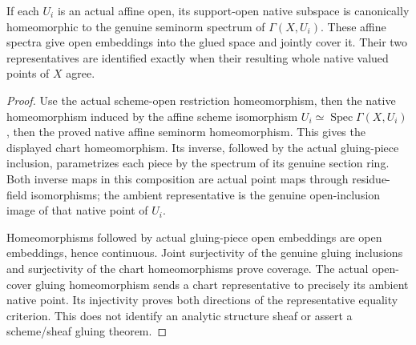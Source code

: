 \begin{theorem}
\label{scheme:native-affine-atlas}
\leanok
{}
If each $U_i$ is an actual affine open, its support-open native subspace
is canonically homeomorphic to the genuine seminorm spectrum of
$\Gamma(X,U_i)$. These affine spectra give open embeddings into the glued
space and jointly cover it. Their two representatives are identified
exactly when their resulting whole native valued points of $X$ agree.
\end{theorem}
\begin{proof}
Use the actual scheme-open restriction homeomorphism, then the native
homeomorphism induced by the affine scheme isomorphism
$U_i\simeq\operatorname{Spec}\Gamma(X,U_i)$, then the proved native affine
seminorm homeomorphism. This gives the displayed chart homeomorphism. Its
inverse, followed by the actual gluing-piece inclusion, parametrizes each
piece by the spectrum of its genuine section ring. Both inverse maps in
this composition are actual point maps through residue-field isomorphisms;
the ambient representative is the genuine open-inclusion image of that
native point of $U_i$.

Homeomorphisms followed by actual gluing-piece open embeddings are open
embeddings, hence continuous. Joint surjectivity of the genuine gluing
inclusions and surjectivity of the chart homeomorphisms prove coverage.
The actual open-cover gluing homeomorphism sends a chart representative
to precisely its ambient native point. Its injectivity proves both directions
of the representative equality criterion. This does not identify an analytic
structure sheaf or assert a scheme/sheaf gluing theorem.
\end{proof}

